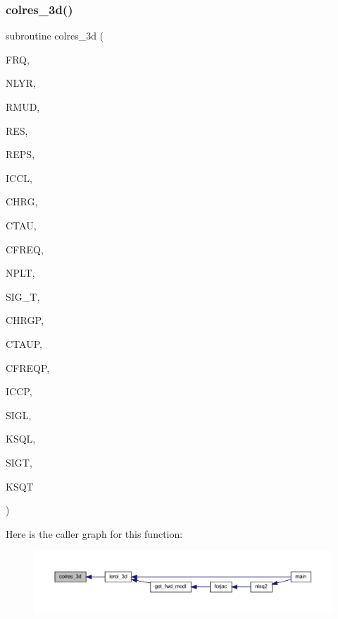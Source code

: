 \subsubsection{\texorpdfstring{colres\+\_\+3d()}{colres\_3d()}}
{\footnotesize\ttfamily subroutine colres\+\_\+3d (\begin{DoxyParamCaption}\item[{real}]{F\+RQ,  }\item[{integer}]{N\+L\+YR,  }\item[{real(kind=ql), dimension(0\+:nlyr)}]{R\+M\+UD,  }\item[{real, dimension(nlyr)}]{R\+ES,  }\item[{real, dimension(nlyr)}]{R\+E\+PS,  }\item[{integer, dimension(nlyr)}]{I\+C\+CL,  }\item[{real, dimension(nlyr)}]{C\+H\+RG,  }\item[{real, dimension(nlyr)}]{C\+T\+AU,  }\item[{real, dimension(nlyr)}]{C\+F\+R\+EQ,  }\item[{integer}]{N\+P\+LT,  }\item[{real, dimension(nplt)}]{S\+I\+G\+\_\+T,  }\item[{real, dimension(nplt)}]{C\+H\+R\+GP,  }\item[{real, dimension(nplt)}]{C\+T\+A\+UP,  }\item[{real, dimension(nplt)}]{C\+F\+R\+E\+QP,  }\item[{integer, dimension(nplt)}]{I\+C\+CP,  }\item[{complex(kind=ql), dimension(nlyr)}]{S\+I\+GL,  }\item[{complex(kind=ql), dimension(nlyr)}]{K\+S\+QL,  }\item[{complex, dimension(nplt)}]{S\+I\+GT,  }\item[{complex, dimension(nplt)}]{K\+S\+QT }\end{DoxyParamCaption})}

Here is the caller graph for this function\+:\nopagebreak
\begin{figure}[H]
\begin{center}
\leavevmode
\includegraphics[width=350pt]{Leroi_8f90_a61eed94d3789d0474014a2cd34a792c6_icgraph}
\end{center}
\end{figure}
\mbox{\label{Leroi_8f90_a12a40dde1170214455093566ef5e8bb4}} 
